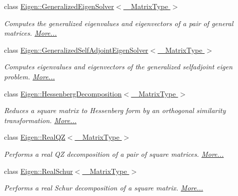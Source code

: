 \begin{DoxyCompactItemize}
class \hyperlink{group___eigenvalues___module_class_eigen_1_1_generalized_eigen_solver}{Eigen\+::\+Generalized\+Eigen\+Solver$<$ \+\_\+\+Matrix\+Type $>$}
\begin{DoxyCompactList}\small\item\em Computes the generalized eigenvalues and eigenvectors of a pair of general matrices.  \hyperlink{group___eigenvalues___module_class_eigen_1_1_generalized_eigen_solver}{More...}\end{DoxyCompactList}\item 
class \hyperlink{group___eigenvalues___module_class_eigen_1_1_generalized_self_adjoint_eigen_solver}{Eigen\+::\+Generalized\+Self\+Adjoint\+Eigen\+Solver$<$ \+\_\+\+Matrix\+Type $>$}
\begin{DoxyCompactList}\small\item\em Computes eigenvalues and eigenvectors of the generalized selfadjoint eigen problem.  \hyperlink{group___eigenvalues___module_class_eigen_1_1_generalized_self_adjoint_eigen_solver}{More...}\end{DoxyCompactList}\item 
class \hyperlink{group___eigenvalues___module_class_eigen_1_1_hessenberg_decomposition}{Eigen\+::\+Hessenberg\+Decomposition$<$ \+\_\+\+Matrix\+Type $>$}
\begin{DoxyCompactList}\small\item\em Reduces a square matrix to Hessenberg form by an orthogonal similarity transformation.  \hyperlink{group___eigenvalues___module_class_eigen_1_1_hessenberg_decomposition}{More...}\end{DoxyCompactList}\item 
class \hyperlink{group___eigenvalues___module_class_eigen_1_1_real_q_z}{Eigen\+::\+Real\+Q\+Z$<$ \+\_\+\+Matrix\+Type $>$}
\begin{DoxyCompactList}\small\item\em Performs a real QZ decomposition of a pair of square matrices.  \hyperlink{group___eigenvalues___module_class_eigen_1_1_real_q_z}{More...}\end{DoxyCompactList}\item 
class \hyperlink{group___eigenvalues___module_class_eigen_1_1_real_schur}{Eigen\+::\+Real\+Schur$<$ \+\_\+\+Matrix\+Type $>$}
\begin{DoxyCompactList}\small\item\em Performs a real Schur decomposition of a square matrix.  \hyperlink{group___eigenvalues___module_class_eigen_1_1_real_schur}{More...}\end{DoxyCompactList}\item 

\end{DoxyCompactItemize}
